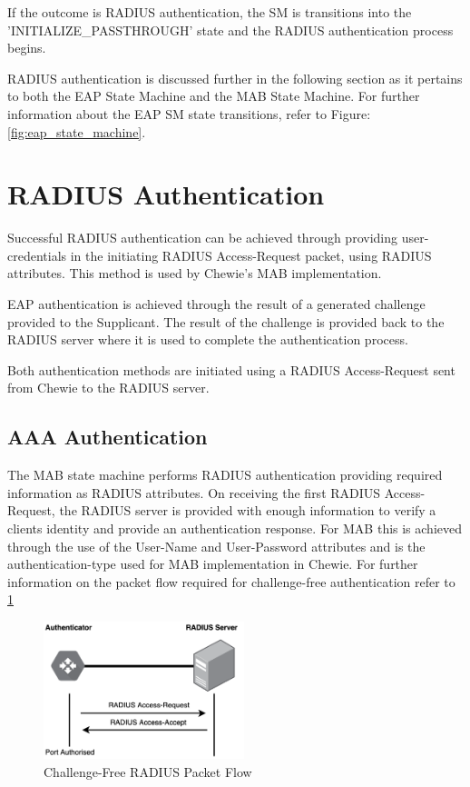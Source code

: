 If the outcome is RADIUS authentication, the SM is transitions into the 'INITIALIZE\_PASSTHROUGH' state and the RADIUS authentication process begins.

RADIUS authentication is discussed further in the following section as it pertains to both the EAP State Machine and the MAB State Machine. For further information about the EAP SM state transitions, refer to Figure: \ref{fig:eap_state_machine}.

\section{RADIUS Authentication}
Successful RADIUS authentication can be achieved through providing user-credentials in the initiating RADIUS Access-Request packet, using RADIUS attributes. This method is used by Chewie's MAB implementation.

EAP authentication is achieved through the result of a generated challenge provided to the Supplicant. The result of the challenge is provided back to the RADIUS server where it is used to complete the authentication process.

Both authentication methods are initiated using a RADIUS Access-Request sent from Chewie to the RADIUS server.

\subsection{AAA Authentication}
The MAB state machine performs RADIUS authentication providing required information as RADIUS attributes. On receiving the first RADIUS Access-Request, the RADIUS server is provided with enough information to verify a clients identity and provide an authentication response. For MAB this is achieved through the use of the User-Name and User-Password attributes and is the authentication-type used for MAB implementation in Chewie. For further information on the packet flow required for challenge-free authentication refer to \ref{fig:no_challenge_radius}
\begin{figure}\begin{center}
    \includegraphics[height=4cm]{images/no_challenge_radius.png}
    \caption{Challenge-Free RADIUS Packet Flow}
    \label{fig:no_challenge_radius}
\end{center}\end{figure}

